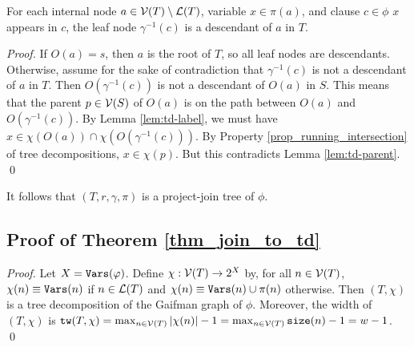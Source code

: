 \begin{lemma}
    For each internal node $a \in \mathcal{V}(T) \setminus \mathcal{L}(T)$, variable $x \in \pi(a)$, and clause $c \in \phi$ \st{} $x$ appears in $c$, the leaf node $\gamma^{-1}(c)$ is a descendant of $a$ in $T$.
\end{lemma}
\begin{proof}
    If $O(a) = s$, then $a$ is the root of $T$, so all leaf nodes are descendants.
    Otherwise, assume for the sake of contradiction that $\gamma^{-1}(c)$ is not a descendant of $a$ in $T$.
    Then $O(\gamma^{-1}(c))$ is not a descendant of $O(a)$ in $S$.
    This means that the parent $p \in \mathcal{V}(S)$ of $O(a)$ is on the path between $O(a)$ and $O(\gamma^{-1}(c))$.
    By Lemma \ref{lem:td-label}, we must have $x \in \chi(O(a)) \cap \chi(O(\gamma^{-1}(c)))$.
    By Property \ref{prop_running_intersection} of tree decompositions, $x \in \chi(p)$.
    But this contradicts Lemma \ref{lem:td-parent}.
\qed
\end{proof}

It follows that $(T, r, \gamma, \pi)$ is a project-join tree of $\phi$.


\subsection{Proof of Theorem \ref{thm_join_to_td}}

\begin{proof}
    Let $X = \texttt{\upshape Vars}(\varphi)$.
    Define $\chi: \mathcal{V}(T) \to 2^X$ by, for all $n \in \mathcal{V}(T)$,
    $\chi(n) \equiv\texttt{\upshape Vars}(n)$ if $n \in \mathcal{L}(T)$ and $\chi(n) \equiv \texttt{\upshape Vars}(n) \cup \pi(n)$ otherwise.
    Then $(T, \chi)$ is a tree decomposition of the Gaifman graph of $\phi$.
    Moreover, the width of $(T, \chi)$ is $\texttt{\upshape tw}(T, \chi) = \max_{n \in \mathcal{V}(T)} \left| \chi (n) \right|  - 1 = \max_{n \in \mathcal{V}(T)} \texttt{\upshape size}(n) - 1 = w - 1$.
\qed
\end{proof}

